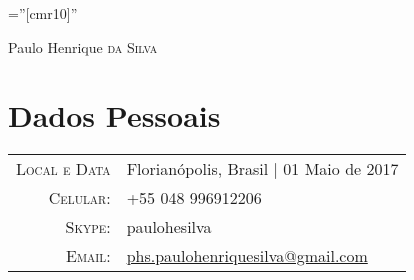 \documentclass[a4paper,10pt]{article}
\begin{document}
\pagestyle{empty} %

\font\fb=''[cmr10]'' %

\par{\centering
		{\Huge Paulo Henrique \textsc{da Silva}
	}\bigskip\par}

\section{Dados Pessoais}

\begin{tabular}{rl}
    \textsc{Local e Data} & Florianópolis, Brasil  | 01 Maio de 2017 \\
    \textsc{Celular:}     & +55 048 996912206\\
    \textsc{Skype:}     & paulohesilva\\
    \textsc{Email:}     & \href{mailto:phs.paulohenriquesilva@gmail.com}{phs.paulohenriquesilva@gmail.com}
\end{tabular}

\end{document}
